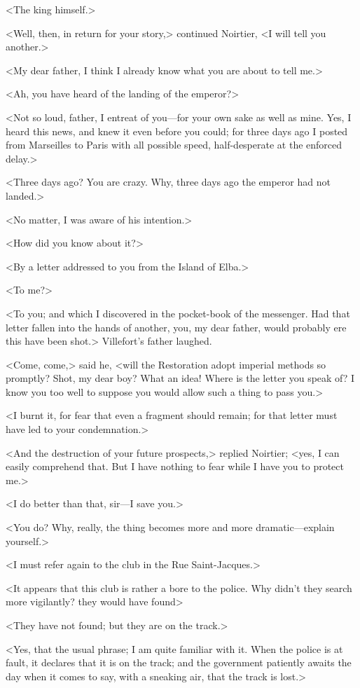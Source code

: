  <The king himself.> 

 <Well, then, in return for your story,> continued Noirtier, <I will tell you another.> 

 <My dear father, I think I already know what you are about to tell me.> 

 <Ah, you have heard of the landing of the emperor?> 

 <Not so loud, father, I entreat of you—for your own sake as well as mine. Yes, I heard this news, and knew it even before you could; for three days ago I posted from Marseilles to Paris with all possible speed, half-desperate at the enforced delay.> 

 <Three days ago? You are crazy. Why, three days ago the emperor had not landed.> 

 <No matter, I was aware of his intention.> 

 <How did you know about it?> 

 <By a letter addressed to you from the Island of Elba.> 

 <To me?> 

 <To you; and which I discovered in the pocket-book of the messenger. Had that letter fallen into the hands of another, you, my dear father, would probably ere this have been shot.> Villefort's father laughed. 

 <Come, come,> said he, <will the Restoration adopt imperial methods so promptly? Shot, my dear boy? What an idea! Where is the letter you speak of? I know you too well to suppose you would allow such a thing to pass you.> 

 <I burnt it, for fear that even a fragment should remain; for that letter must have led to your condemnation.> 

 <And the destruction of your future prospects,> replied Noirtier; <yes, I can easily comprehend that. But I have nothing to fear while I have you to protect me.> 

 <I do better than that, sir—I save you.> 

 <You do? Why, really, the thing becomes more and more dramatic—explain yourself.> 

 <I must refer again to the club in the Rue Saint-Jacques.> 

 <It appears that this club is rather a bore to the police. Why didn't they search more vigilantly? they would have found\longdash> 

 <They have not found; but they are on the track.> 

 <Yes, that the usual phrase; I am quite familiar with it. When the police is at fault, it declares that it is on the track; and the government patiently awaits the day when it comes to say, with a sneaking air, that the track is lost.> 

